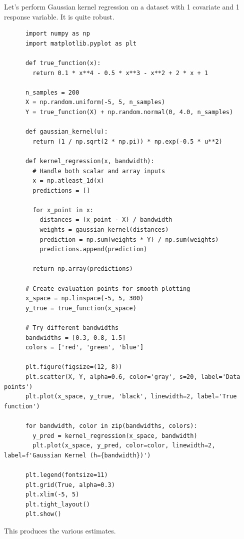   \begin{example}
    Let's perform Gaussian kernel regression on a dataset with 1 covariate and 1 response variable. It is quite robust. 
    
    \begin{lstlisting}
      import numpy as np
      import matplotlib.pyplot as plt

      def true_function(x):
        return 0.1 * x**4 - 0.5 * x**3 - x**2 + 2 * x + 1

      n_samples = 200
      X = np.random.uniform(-5, 5, n_samples)
      Y = true_function(X) + np.random.normal(0, 4.0, n_samples)

      def gaussian_kernel(u):
        return (1 / np.sqrt(2 * np.pi)) * np.exp(-0.5 * u**2)

      def kernel_regression(x, bandwidth):
        # Handle both scalar and array inputs
        x = np.atleast_1d(x)
        predictions = []
        
        for x_point in x:
          distances = (x_point - X) / bandwidth
          weights = gaussian_kernel(distances)
          prediction = np.sum(weights * Y) / np.sum(weights)
          predictions.append(prediction)
        
        return np.array(predictions)

      # Create evaluation points for smooth plotting
      x_space = np.linspace(-5, 5, 300)
      y_true = true_function(x_space)

      # Try different bandwidths
      bandwidths = [0.3, 0.8, 1.5]
      colors = ['red', 'green', 'blue']

      plt.figure(figsize=(12, 8))
      plt.scatter(X, Y, alpha=0.6, color='gray', s=20, label='Data points')
      plt.plot(x_space, y_true, 'black', linewidth=2, label='True function')

      for bandwidth, color in zip(bandwidths, colors):
        y_pred = kernel_regression(x_space, bandwidth)
        plt.plot(x_space, y_pred, color=color, linewidth=2, label=f'Gaussian Kernel (h={bandwidth})')

      plt.legend(fontsize=11)
      plt.grid(True, alpha=0.3)
      plt.xlim(-5, 5)
      plt.tight_layout()
      plt.show()
    \end{lstlisting}

    This produces the various estimates. 


\end{example}
